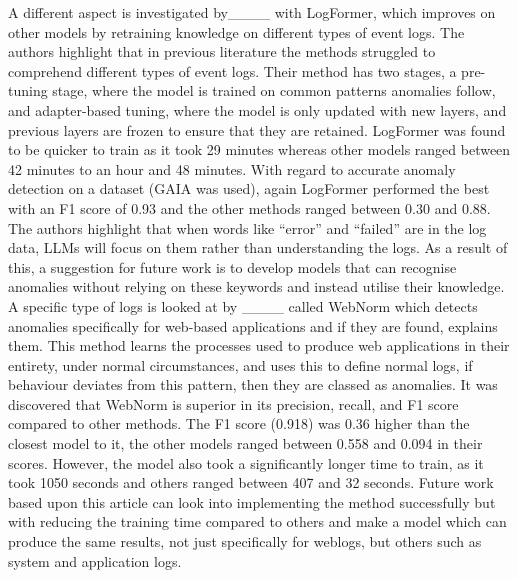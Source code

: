 A different aspect is investigated by____ with LogFormer, which improves on other models by retraining knowledge on different types of event logs. The authors highlight that in previous literature the methods struggled to comprehend different types of event logs. Their method has two stages, a pre-tuning stage, where the model is trained on common patterns anomalies follow, and adapter-based tuning, where the model is only updated with new layers, and previous layers are frozen to ensure that they are retained. LogFormer was found to be quicker to train as it took 29 minutes whereas other models ranged between 42 minutes to an hour and 48 minutes. With regard to accurate anomaly detection on a dataset (GAIA was used), again LogFormer performed the best with an F1 score of 0.93 and the other methods ranged between 0.30 and 0.88. The authors highlight that when words like ``error'' and ``failed'' are in the log data, LLMs will focus on them rather than understanding the logs. As a result of this, a suggestion for future work is to develop models that can recognise anomalies without relying on these keywords and instead utilise their knowledge. A specific type of logs is looked at by ____ called WebNorm which detects anomalies specifically for web-based applications and if they are found, explains them. This method learns the processes used to produce web applications in their entirety, under normal circumstances, and uses this to define normal logs, if behaviour deviates from this pattern, then they are classed as anomalies. It was discovered that WebNorm is superior in its precision, recall, and F1 score compared to other methods. The F1 score (0.918) was 0.36 higher than the closest model to it, the other models ranged between 0.558 and 0.094 in their scores. However, the model also took a significantly longer time to train, as it took 1050 seconds and others ranged between 407 and 32 seconds. Future work based upon this article can look into implementing the method successfully but with reducing the training time compared to others and make a model which can produce the same results, not just specifically for weblogs, but others such as system and application logs.

